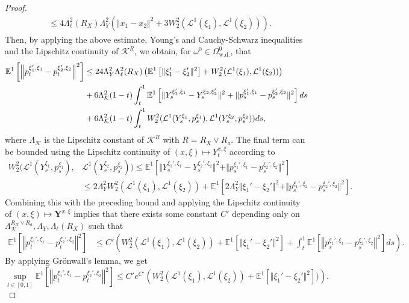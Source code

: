 \documentclass{article}
\newcommand{\E}{\mathbb{E}}
\begin{document}
\begin{appendices}
\begin{proof}
\begin{align*}
    &\le 4\Lambda^2_\ell(R_X)\Lambda^2_Y\left(\Vert x_1-x_2\Vert^2 + 3W^2_2(\mathcal L^1(\xi_1),\mathcal L^1(\xi_2))\right).
\end{align*}
Then, by applying the above estimate, Young's and Cauchy-Schwarz inequalities and the Lipschitz continuity of $\mathcal K^R$, we obtain, for $\omega^0\in \Omega^0_\mathrm{w.d.}$, that
\begin{align}\label{eqn:differeince_in_p}
    \E^1\left[\left\Vert p^{\xi_1',\xi_1}_t-p_t^{\xi_2',\xi_2} \right\Vert^2\right]&\le 24\Lambda_Y^2\Lambda_\ell^2(R_X)\left(\E^1\left[\Vert\xi_1'-\xi_2'\Vert^2\right]+W_2^2(\mathcal L^1(\xi_1),\mathcal L^1(\xi_2)) \right)\notag\\
    & + 6\Lambda^2_{\mathcal K}(1-t)\int_t^1\E^1\left[\Vert Y^{\xi_1',\xi_1}_s-Y^{\xi_2,\xi_2'}_s \Vert^2+\Vert p^{\xi_1',\xi_1}_s-p^{\xi_2',\xi_2}_s\Vert^2 \right]ds\notag\\
    &+ 6\Lambda^2_{\mathcal K}(1-t)\int_t^1 W_2^2(\mathcal L^1(Y^{\xi_1}_s,p^{\xi_1}_s),\mathcal L^1(Y^{\xi_2}_s,p^{\xi_2}_s))ds,
\end{align}
where $\Lambda_\mathcal K$ is the Lipschitz constant of $\mathcal K^R$ with $R=R_X\vee R_a$.
The final term can be bounded using the Lipschitz continuity of $(x,\xi)\mapsto Y_t^{x,\xi}$ according to
\begin{align*}
    W_2^2(\mathcal L^1(Y^{\xi_1}_s,p^{\xi_1}_s),&\mathcal L^1(Y^{\xi_2}_s,p^{\xi_2}_s)) \le \E^1 \left[ \Vert Y_s^{\xi_1',\xi_1}-Y^{\xi_2',\xi_2}_s\Vert^2+\Vert p^{\xi_1',\xi_1}_s-p^{\xi_2',\xi_2}_s \Vert^2\right]\\&\le2\Lambda_Y^2W^2_2(\mathcal L^1(\xi_1),\mathcal L^1(\xi_2))+\E^1 \left[ 2\Lambda_Y^2\Vert\xi_1'-\xi_2' \Vert^2+\Vert p^{\xi_1',\xi_2}_s-p^{\xi_2',\xi_2}_s \Vert^2\right].
\end{align*}
Combining this with the preceding bound  and applying the Lipschitz continuity of $(x,\xi)\mapsto\bm Y^{x,\xi}$ implies that there exists some constant $C'$ depending only on $\Lambda^{R_X\vee R_a}_{\mathcal K},\Lambda_Y,\Lambda_\ell(R_X)$ such that 
\begin{align*}
    \E^1\left[\left\Vert p^{\xi_1',\xi_1}_t-p_t^{\xi_2',\xi_2} \right\Vert^2\right]&\le C' \left( W^2_2(\mathcal L^1(\xi_1),\mathcal L^1(\xi_2))+ \E^1[\Vert \xi_1'-\xi_2' \Vert^2]+\int_t^1 \E^1\left[\left\Vert p^{\xi_1',\xi_1}_s-p_s^{\xi_2',\xi_2} \right\Vert^2 \right]ds\right).
\end{align*}
By applying Gr\"onwall's lemma, we get
\[
\sup_{t\in[0,1]}\E^1\left[\left\Vert p^{\xi_1',\xi_1}_t-p_t^{\xi_2',\xi_2} \right\Vert^2 \right]\le C'e^{C'}\left( W_2^2(\mathcal L^1(\xi_1),\mathcal L^1(\xi_2))+ \E^1\left[\Vert \xi_1'-\xi_2'\Vert^2\right])\right).
\]
\end{proof}
\end{appendices}
\end{document}
